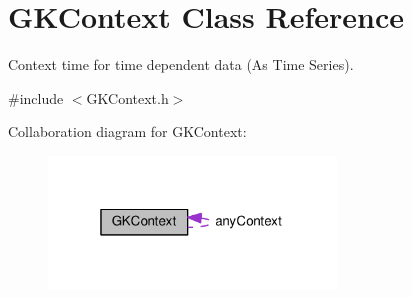 \hypertarget{classGKContext}{}\section{G\+K\+Context Class Reference}
\label{classGKContext}


Context time for time dependent data (As Time Series).  




{\ttfamily \#include $<$G\+K\+Context.\+h$>$}



Collaboration diagram for G\+K\+Context\+:
\nopagebreak
\begin{figure}[H]
\begin{center}
\leavevmode
\includegraphics[width=217pt]{classGKContext__coll__graph}
\end{center}
\end{figure}
